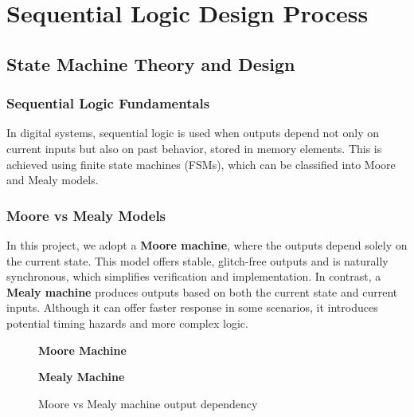 \documentclass[10pt,a4paper]{article}
\begin{document}
\section*{Sequential Logic Design Process}

\subsection*{State Machine Theory and Design}

\subsubsection*{Sequential Logic Fundamentals}

In digital systems, sequential logic is used when outputs depend not only on current inputs but also on past behavior, stored in memory elements. This is achieved using finite state machines (FSMs), which can be classified into Moore and Mealy models.

\subsubsection*{Moore vs Mealy Models}

In this project, we adopt a \textbf{Moore machine}, where the outputs depend solely on the current state. This model offers stable, glitch-free outputs and is naturally synchronous, which simplifies verification and implementation. In contrast, a \textbf{Mealy machine} produces outputs based on both the current state and current inputs. Although it can offer faster response in some scenarios, it introduces potential timing hazards and more complex logic.

\begin{figure}[H]
\centering
\begin{minipage}{0.45\textwidth}
\centering
\textbf{Moore Machine}
\end{minipage}
\hfill
\begin{minipage}{0.45\textwidth}
\centering
\textbf{Mealy Machine}
\end{minipage}
\caption{Moore vs Mealy machine output dependency}
\end{figure}
\end{document}
